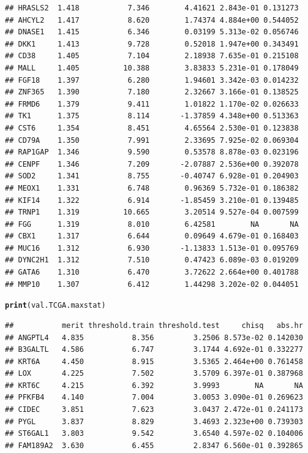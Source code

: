 \documentclass{article}\usepackage[]{graphicx}\usepackage[]{color}
\makeatletter
\newcommand{\hlstd}[1]{\textcolor[rgb]{0.345,0.345,0.345}{#1}}%
\newcommand{\hlkwd}[1]{\textcolor[rgb]{0.737,0.353,0.396}{\textbf{#1}}}%
\newenvironment{kframe}{%
 \def\at@end@of@kframe{}%
 \ifinner\ifhmode%
  \def\at@end@of@kframe{\end{minipage}}%
  \begin{minipage}{\columnwidth}%
 \fi\fi%
 \def\FrameCommand##1{\hskip\@totalleftmargin \hskip-\fboxsep
 \colorbox{shadecolor}{##1}\hskip-\fboxsep
     \hskip-\linewidth \hskip-\@totalleftmargin \hskip\columnwidth}%
 \MakeFramed {\advance\hsize-\width
   \@totalleftmargin\z@ \linewidth\hsize
   \@setminipage}}%
 {\par\unskip\endMakeFramed%
 \at@end@of@kframe}
\newenvironment{knitrout}{}{} %
\makeatother
\begin{document}
\begin{knitrout}
\begin{kframe}
\begin{verbatim}
## HRASLS2  1.418           7.346        4.41621 2.843e-01 0.131273
## AHCYL2   1.417           8.620        1.74374 4.884e+00 0.544052
## DNASE1   1.415           6.346        0.03199 5.313e-02 0.056746
## DKK1     1.413           9.728        0.52018 1.947e+00 0.343491
## CD38     1.405           7.104        2.18938 7.635e-01 0.215108
## MALL     1.405          10.388        3.83833 5.231e-01 0.178049
## FGF18    1.397           6.280        1.94601 3.342e-03 0.014232
## ZNF365   1.390           7.180        2.32667 3.166e-01 0.138525
## FRMD6    1.379           9.411        1.01822 1.170e-02 0.026633
## TK1      1.375           8.114       -1.37859 4.348e+00 0.513363
## CST6     1.354           8.451        4.65564 2.530e-01 0.123838
## CD79A    1.350           7.991        2.33695 7.925e-02 0.069304
## RAP1GAP  1.346           9.590        0.53578 8.878e-03 0.023196
## CENPF    1.346           7.209       -2.07887 2.536e+00 0.392078
## SOD2     1.341           8.755       -0.40747 6.928e-01 0.204903
## MEOX1    1.331           6.748        0.96369 5.732e-01 0.186382
## KIF14    1.322           6.914       -1.85459 3.210e-01 0.139485
## TRNP1    1.319          10.665        3.20514 9.527e-04 0.007599
## FGG      1.319           8.010        6.42581        NA       NA
## CBX1     1.317           6.644        0.09649 4.679e-01 0.168403
## MUC16    1.312           6.930       -1.13833 1.513e-01 0.095769
## DYNC2H1  1.312           7.510        0.47423 6.089e-03 0.019209
## GATA6    1.310           6.470        3.72622 2.664e+00 0.401788
## MMP10    1.307           6.412        1.44298 3.202e-02 0.044051
\end{verbatim}
\begin{alltt}
\hlkwd{print}\hlstd{(val.TCGA.maxstat)}
\end{alltt}
\begin{verbatim}
##           merit threshold.train threshold.test     chisq   abs.hr
## ANGPTL4   4.835           8.356         3.2506 8.573e-02 0.142030
## B3GALTL   4.586           6.747         3.1744 4.692e-01 0.332277
## KRT6A     4.450           8.915         3.5365 2.464e+00 0.761458
## LOX       4.225           7.502         3.5709 6.397e-01 0.387968
## KRT6C     4.215           6.392         3.9993        NA       NA
## PFKFB4    4.140           7.004         3.0053 3.090e-01 0.269623
## CIDEC     3.851           7.623         3.0437 2.472e-01 0.241173
## PYGL      3.837           8.829         3.4693 2.323e+00 0.739303
## ST6GAL1   3.803           9.542         3.6540 4.597e-02 0.104006
## FAM189A2  3.630           6.455         2.8347 6.560e-01 0.392865

\end{verbatim}
\end{kframe}
\end{knitrout}
\end{document}
